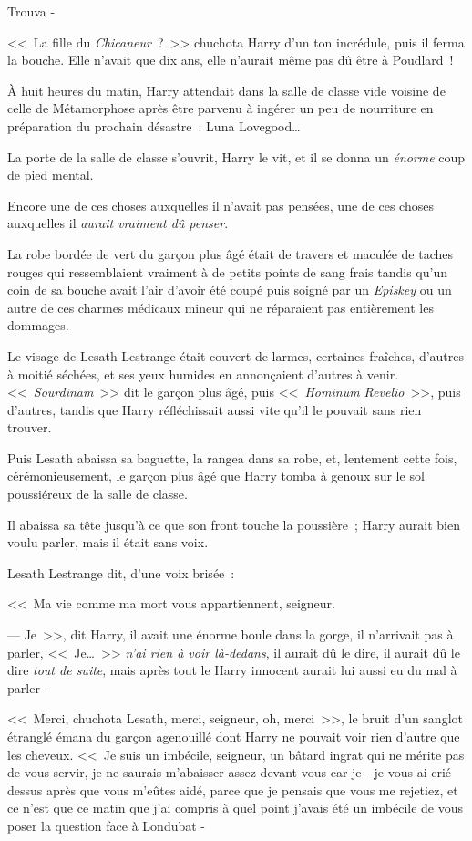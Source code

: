Trouva -

<<~La fille du \emph{Chicaneur}~?~>> chuchota Harry d'un ton incrédule, puis il ferma la bouche. Elle n'avait que dix ans, elle n'aurait même pas dû être à Poudlard~!


À huit heures du matin, Harry attendait dans la salle de classe vide voisine de celle de Métamorphose après être parvenu à ingérer un peu de nourriture en préparation du prochain désastre~: Luna Lovegood…

La porte de la salle de classe s'ouvrit, Harry le vit, et il se donna un \emph{énorme} coup de pied mental.

Encore une de ces choses auxquelles il n'avait pas pensées, une de ces choses auxquelles il \emph{aurait vraiment dû penser}.

La robe bordée de vert du garçon plus âgé était de travers et maculée de taches rouges qui ressemblaient vraiment à de petits points de sang frais tandis qu'un coin de sa bouche avait l'air d'avoir été coupé puis soigné par un \emph{Episkey} ou un autre de ces charmes médicaux mineur qui ne réparaient pas entièrement les dommages.

Le visage de Lesath Lestrange était couvert de larmes, certaines fraîches, d'autres à moitié séchées, et ses yeux humides en annonçaient d'autres à venir. <<~\emph{Sourdinam}~>> dit le garçon plus âgé, puis <<~\emph{Hominum Revelio}~>>, puis d'autres, tandis que Harry réfléchissait aussi vite qu'il le pouvait sans rien trouver.

Puis Lesath abaissa sa baguette, la rangea dans sa robe, et, lentement cette fois, cérémonieusement, le garçon plus âgé que Harry tomba à genoux sur le sol poussiéreux de la salle de classe.

Il abaissa sa tête jusqu'à ce que son front touche la poussière~; Harry aurait bien voulu parler, mais il était sans voix.

Lesath Lestrange dit, d'une voix brisée~:

<<~Ma vie comme ma mort vous appartiennent, seigneur.

--- Je~>>, dit Harry, il avait une énorme boule dans la gorge, il n'arrivait pas à parler, <<~Je…~>> \emph{n'ai rien à voir là-dedans}, il aurait dû le dire, il aurait dû le dire \emph{tout de suite}, mais après tout le Harry innocent aurait lui aussi eu du mal à parler -

<<~Merci, chuchota Lesath, merci, seigneur, oh, merci~>>, le bruit d'un sanglot étranglé émana du garçon agenouillé dont Harry ne pouvait voir rien d'autre que les cheveux. <<~Je suis un imbécile, seigneur, un bâtard ingrat qui ne mérite pas de vous servir, je ne saurais m'abaisser assez devant vous car je - je vous ai crié dessus après que vous m'eûtes aidé, parce que je pensais que vous me rejetiez, et ce n'est que ce matin que j'ai compris à quel point j'avais été un imbécile de vous poser la question face à Londubat -

